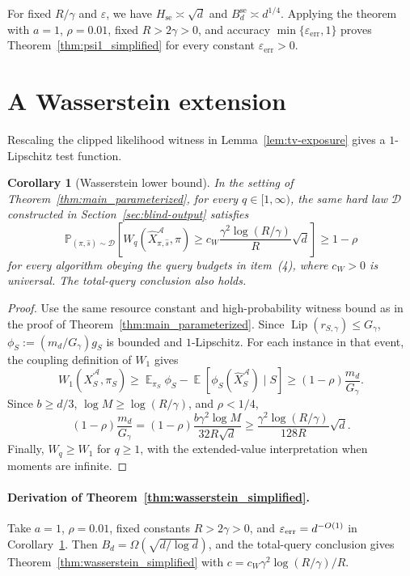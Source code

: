 \documentclass[11pt,letterpaper]{article}
\newtheorem{corollary}[theorem]{Corollary}
\DeclareMathOperator*{\E}{\mathbb{E}}
\newcommand{\eps}{\varepsilon}
\newcommand{\1}{\mathbbm{1}}
\DeclareMathOperator{\Lip}{Lip}
\newcommand{\Prob}{\mathbb P}
\begin{document}
For fixed \(R/\gamma\) and \(\eps\), we have
\(H_{\mathrm{se}}\asymp\sqrt d\) and
\(B_d^{\mathrm{se}}\asymp d^{1/4}\).
Applying the theorem with \(a=1\), \(\rho=0.01\), fixed
\(R>2\gamma>0\), and accuracy \(\min\{\varepsilon_{\mathrm{err}},1\}\)
proves Theorem~\ref{thm:psi1_simplified} for every constant
\(\varepsilon_{\mathrm{err}}>0\).

\section{A Wasserstein extension}
\label{sec:wasserstein}

Rescaling the clipped likelihood witness in Lemma~\ref{lem:tv-exposure}
gives a \(1\)-Lipschitz test function.

\begin{corollary}[Wasserstein lower bound]\label{cor:wasserstein}
In the setting of Theorem~\ref{thm:main_parameterized}, for every
\(q\in[1,\infty)\), the same hard law \(\mathcal D\) constructed in
Section~\ref{sec:blind-output} satisfies
\[
   \Prob_{(\pi,\widehat s)\sim\mathcal D}
   \left[
      W_q(\widehat X_{\pi,\widehat s}^{\mathcal A},\pi)
      \ge c_W\frac{\gamma^2\log(R/\gamma)}{R}\sqrt d
   \right]
   \ge1-\rho
\]
for every algorithm obeying the query budgets in item~\textup{(4)},
where \(c_W>0\) is universal.  The total-query conclusion also holds.
\end{corollary}

\begin{proof}
Use the same resource constant and high-probability witness bound as
in the proof of Theorem~\ref{thm:main_parameterized}.
Since \(\Lip(r_{S,\gamma})\le G_\gamma\),
\(\phi_S:=(m_d/G_\gamma)g_S\) is bounded and \(1\)-Lipschitz.
For each instance in that event, the coupling definition of \(W_1\) gives
\[
   W_1(\widehat X_S^{\mathcal A},\pi_S)
   \ge \E_{\pi_S}\phi_S
      -\E[\phi_S(\widehat X_S^{\mathcal A})\mid S]
   \ge(1-\rho)\frac{m_d}{G_\gamma}.
\]
Since \(b\ge d/3\), \(\log M\ge\log(R/\gamma)\), and \(\rho<1/4\),
\[
   (1-\rho)\frac{m_d}{G_\gamma}
   =(1-\rho)\frac{b\gamma^2\log M}{32R\sqrt d}
   \ge\frac{\gamma^2\log(R/\gamma)}{128R}\sqrt d .
\]
Finally, \(W_q\ge W_1\) for \(q\ge1\), with the extended-value
interpretation when moments are infinite.
\end{proof}

\paragraph{Derivation of Theorem~\ref{thm:wasserstein_simplified}.}
Take \(a=1\), \(\rho=0.01\), fixed constants \(R>2\gamma>0\), and
\(\varepsilon_{\rm err}=d^{-O(1)}\) in Corollary~\ref{cor:wasserstein}.
Then \(B_d=\Omega(\sqrt{d/\log d})\), and the total-query conclusion gives
Theorem~\ref{thm:wasserstein_simplified} with
\(c=c_W\gamma^2\log(R/\gamma)/R\).
\end{document}
